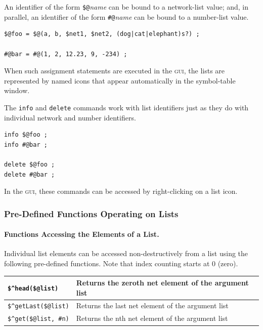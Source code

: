 \documentclass[letterpaper,12pt]{article}
\newcommand{\acro}{\textsc}
\begin{document}
\noindent
An identifier of the form \verb!$@!\emph{name} can be bound to a
network-list value; and, in parallel, an identifier of the form
\verb!#@!\emph{name} can be bound to a number-list value.

\begin{Verbatim}[fontsize=\small]
$@foo = $@(a, b, $net1, $net2, (dog|cat|elephant)s?) ;

#@bar = #@(1, 2, 12.23, 9, -234) ;
\end{Verbatim}

\noindent
When such assignment statements are executed in the \acro{gui}, the lists are
represented by named icons that appear automatically in the symbol-table window.

The \texttt{info} and \texttt{delete} commands work with list identifiers
just as they do with individual network and number identifiers.

\begin{Verbatim}[fontsize=\small]
info $@foo ;
info #@bar ;

delete $@foo ;
delete #@bar ;
\end{Verbatim}

\noindent
In the \acro{gui}, these commands can be accessed by right-clicking on a list
icon.

\subsubsection{Pre-Defined Functions Operating on Lists}

\paragraph{Functions Accessing the Elements of a List.} 
Individual list
elements can be accessed non-destructively from a list using the
following pre-defined functions.  Note that index counting starts at 0
(zero).

\vspace{.5cm}

\noindent
\begin{tabular}{|l|l|}
\hline
\verb!$^head($@list)! & Returns the zeroth net element of the argument list\\
\hline
\verb!$^getLast($@list)! & Returns the last net element of the argument list\\
\hline
\verb!$^get($@list, #n)! & Returns the nth net element of the argument list\\
\hline
\end{tabular}
\end{document}

